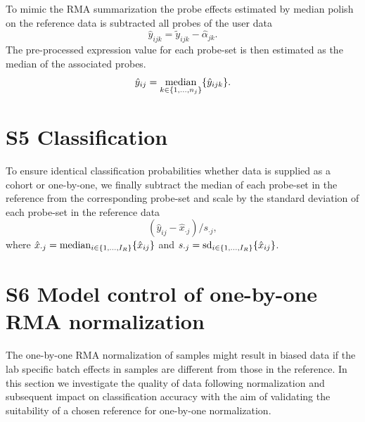 \documentclass{article}
\begin{document}
To mimic the RMA summarization the probe effects estimated by median polish on the reference data is subtracted all probes of the user data
\begin{equation*}
   \hat{y}_{ijk} = \tilde{y}_{ijk} - \hat{\alpha}_{jk}.
\end{equation*}
The pre-processed expression value for each probe-set is then estimated as the median of the associated probes.
\begin{equation*}
   \hat{y}_{ij} = \operatorname*{median}_{k \in \{1,\dots,n_j \}} \{ \hat{y}_{ijk} \}.
\end{equation*}


\section*{S5 Classification}
To ensure identical classification probabilities whether data is supplied as a cohort or one-by-one, we finally subtract the median of each probe-set in the reference from the corresponding probe-set and scale by the standard deviation of each probe-set in the reference data
\begin{equation*}
  (\hat{y}_{ij} - \hat{x}_{\cdot j})/s_{\cdot j},
\end{equation*}
where
$\hat{x}_{\cdot j} = \operatorname*{median}_{i \in \{1,\dots,I_R \}} \{\hat{x}_{ij}\}$ and
$s_{\cdot j} = \operatorname*{sd}_{i \in \{1,\dots,I_R\}} \{\hat{x}_{ij}\}$.


\section*{S6 Model control of one-by-one RMA normalization} \label{sec:rle}
The one-by-one RMA normalization of samples might result in biased data if the lab specific batch effects in samples are different from those in the reference. In this section we investigate the quality of data following normalization and subsequent impact on classification accuracy with the aim of validating the suitability of a chosen reference for one-by-one normalization.
\end{document}
